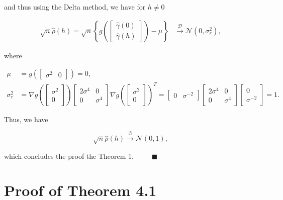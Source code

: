 \documentclass[]{book}
\theoremstyle{definition}
\theoremstyle{definition}
\theoremstyle{definition}
\theoremstyle{remark}
\begin{document}
and thus using the Delta method, we have for \(h \neq 0\)

\[
\begin{aligned}
    \sqrt{n}\hat{\rho}(h) =
    \sqrt{n}\left\{g\left(
        \begin{bmatrix}
         \hat{\gamma} \left( 0 \right) \\
         \hat{\gamma} \left( h \right)
        \end{bmatrix} \right)
    - {\mu} \right\}
    &\overset{\mathcal{D}}{\to} 
    \mathcal{N}\left(0, \sigma_r^2 \right),
    \end{aligned}
\]

where

\[
\begin{aligned}
{\mu} &= g\left(\begin{bmatrix}
         \sigma^2 & 0
        \end{bmatrix} \right) = 0,\\
\sigma_r^2 &= \nabla g\left(\begin{bmatrix}
         \sigma^2 \\
         0
        \end{bmatrix} \right) \begin{bmatrix}
         2\sigma^4 & 0\\
         0 & \sigma^4
        \end{bmatrix} \nabla g\left(\begin{bmatrix}
         \sigma^2 \\
         0
        \end{bmatrix} \right)^{T}
         = \begin{bmatrix}
         0 & \sigma^{-2}
        \end{bmatrix}  \begin{bmatrix}
         2\sigma^4 & 0\\
         0 & \sigma^4
        \end{bmatrix} \begin{bmatrix}
         0 \\
         \sigma^{-2}
        \end{bmatrix} = 1.
    \end{aligned}
\]

Thus, we have

\[
\sqrt{n}\hat{\rho}(h) \overset{\mathcal{D}}{\to} 
    \mathcal{N}\left(0, 1 \right),
\]

which concludes the proof the Theorem 1.
\(\;\;\;\;\;\;\;\; \blacksquare\)

\section{Proof of Theorem 4.1}\label{appendixc}
\end{document}
